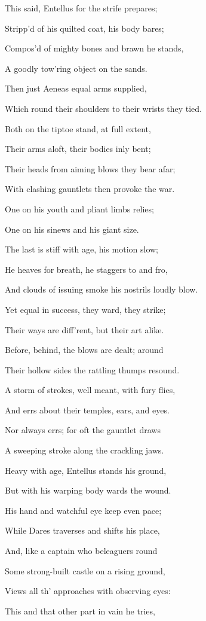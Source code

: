 This said, Entellus for the strife prepares;

Stripp’d of his quilted coat, his body bares;

Compos’d of mighty bones and brawn he stands,

A goodly tow’ring object on the sands.

Then just Aeneas equal arms supplied,

Which round their shoulders to their wrists they tied.

Both on the tiptoe stand, at full extent,

Their arms aloft, their bodies inly bent;

Their heads from aiming blows they bear afar;

With clashing gauntlets then provoke the war.

One on his youth and pliant limbs relies;

One on his sinews and his giant size.

The last is stiff with age, his motion slow;

He heaves for breath, he staggers to and fro,

And clouds of issuing smoke his nostrils loudly blow.

Yet equal in success, they ward, they strike;

Their ways are diff’rent, but their art alike.

Before, behind, the blows are dealt; around

Their hollow sides the rattling thumps resound.

A storm of strokes, well meant, with fury flies,

And errs about their temples, ears, and eyes.

Nor always errs; for oft the gauntlet draws

A sweeping stroke along the crackling jaws.

Heavy with age, Entellus stands his ground,

But with his warping body wards the wound.

His hand and watchful eye keep even pace;

While Dares traverses and shifts his place,

And, like a captain who beleaguers round

Some strong-built castle on a rising ground,

Views all th’ approaches with observing eyes:

This and that other part in vain he tries,

